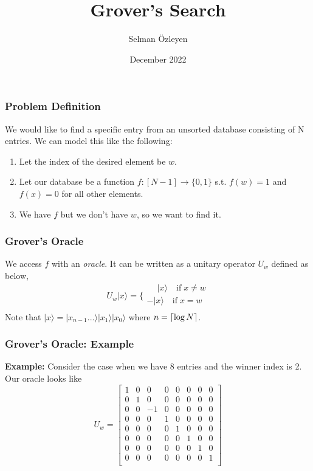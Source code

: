 \documentclass{beamer}
\title{Grover's Search }
\author{Selman \"Ozleyen}
\institute{Technische Universit\"at M\"unchen\\
School of Computation, Information and Technology\\}
\date{December 2022}
\DeclarePairedDelimiter{\ceil}{\lceil}{\rceil}
\begin{document}
\frame{\titlepage}



\begin{frame}
  \frametitle{Problem Definition}
  We would like to find a specific entry from an unsorted
  database consisting of N entries. We can model this like the following:
  \begin{enumerate}
    \item Let the index of the desired element be $w$.
    \item Let our database be a function 
    $f:[N-1]\rightarrow\{0,1\}$ s.t. $f(w)=1$ and $f(x)=0$ for all other elements.
    \item We have $f$ but we don't have $w$, so we want to find it.
  \end{enumerate}
\end{frame}




\begin{frame}
  \frametitle{Grover's Oracle}
  We access $f$ with an \textit{oracle}. It can be written
  as a unitary operator $U_w$ defined as below,
  $$
  U_w|x\rangle = \bigg\{
    \begin{aligned}
    \phantom{-}|x\rangle \quad \text{if} \; x \neq w \\
    -|x\rangle \quad \text{if} \; x = w \\
    \end{aligned}
    $$
  Note that $|x\rangle = |x_{n-1}...\rangle|x_1\rangle |x_0\rangle$ where $n=\ceil{\log N}$.
\end{frame}

\begin{frame}
  \frametitle{Grover's Oracle: Example}
  \textbf{Example:}
  Consider the case when we have 8 entries and the winner index is 2. Our oracle looks like
  $$
  U_w = 
\begin{bmatrix}
1 & 0 & 0 & 0 & 0 & 0 & 0 & 0 \\
0 & 1 & 0 & 0 & 0 & 0 & 0 & 0 \\
0 & 0 & -1 & 0 & 0 & 0 & 0 & 0 \\
0 & 0 & 0 & 1 & 0 & 0 & 0 & 0 \\
0 & 0 & 0 & 0 & 1 & 0 & 0 & 0 \\
0 & 0 & 0 & 0 & 0 & 1 & 0 & 0 \\
0 & 0 & 0 & 0 & 0 & 0 & 1 & 0 \\
0 & 0 & 0 & 0 & 0 & 0 & 0 & 1 \\
\end{bmatrix}
  $$
\end{frame}
\end{document}
